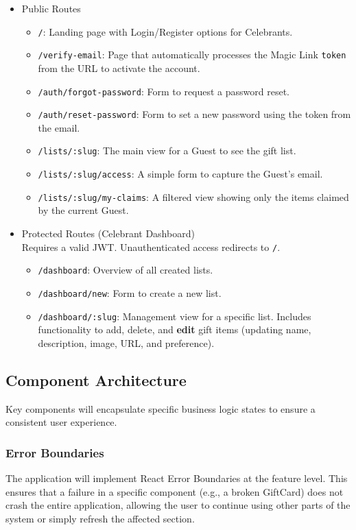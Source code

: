 \begin{itemize}
    \item Public Routes \\
    \begin{itemize}
        \item \texttt{/}: Landing page with Login/Register options for Celebrants.
        \item \texttt{/verify-email}: Page that automatically processes the Magic Link \texttt{token} from the URL to activate the account.
        \item \texttt{/auth/forgot-password}: Form to request a password reset.
        \item \texttt{/auth/reset-password}: Form to set a new password using the token from the email.
        \item \texttt{/lists/:slug}: The main view for a Guest to see the gift list.
        \item \texttt{/lists/:slug/access}: A simple form to capture the Guest's email.
        \item \texttt{/lists/:slug/my-claims}: A filtered view showing only the items claimed by the current Guest.
    \end{itemize}
    \item Protected Routes (Celebrant Dashboard) \\
    Requires a valid JWT. Unauthenticated access redirects to \texttt{/}.
    \begin{itemize}
        \item \texttt{/dashboard}: Overview of all created lists.
        \item \texttt{/dashboard/new}: Form to create a new list.
        \item \texttt{/dashboard/:slug}: Management view for a specific list. Includes functionality to add, delete, and \textbf{edit} gift items (updating name, description, image, URL, and preference).
    \end{itemize}
\end{itemize}

\subsection{Component Architecture}
Key components will encapsulate specific business logic states to ensure a consistent user experience.

\subsubsection{Error Boundaries}
The application will implement React Error Boundaries at the feature level. This ensures that a failure in a specific component (e.g., a broken GiftCard) does not crash the entire application, allowing the user to continue using other parts of the system or simply refresh the affected section.

